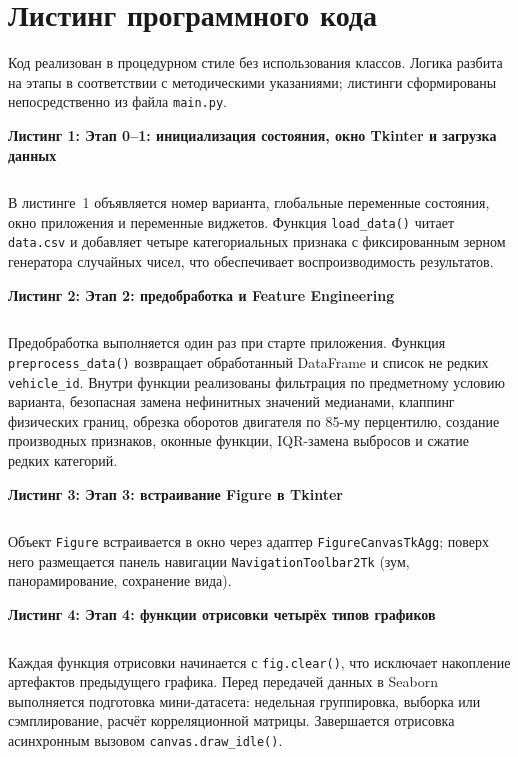 \documentclass[oneside,a4paper,14pt]{extarticle}
\begin{document}
\section{Листинг программного кода}

Код реализован в процедурном стиле без использования классов. Логика разбита на этапы в соответствии с методическими указаниями; листинги сформированы непосредственно из файла \texttt{main.py}.

\noindent\textbf{Листинг 1: Этап 0--1: инициализация состояния, окно Tkinter и загрузка данных}\par\smallskip
\inputminted[firstline=1,lastline=62]{python}{main.py}

В листинге~1 объявляется номер варианта, глобальные переменные состояния, окно приложения и переменные виджетов. Функция \texttt{load\_data()} читает \texttt{data.csv} и добавляет четыре категориальных признака с фиксированным зерном генератора случайных чисел, что обеспечивает воспроизводимость результатов.

\noindent\textbf{Листинг 2: Этап 2: предобработка и Feature Engineering}\par\smallskip
\inputminted[firstline=65,lastline=159]{python}{main.py}

Предобработка выполняется один раз при старте приложения. Функция \texttt{preprocess\_data()} возвращает обработанный DataFrame и список не редких \texttt{vehicle\_id}. Внутри функции реализованы фильтрация по предметному условию варианта, безопасная замена нефинитных значений медианами, клаппинг физических границ, обрезка оборотов двигателя по 85-му перцентилю, создание производных признаков, оконные функции, IQR-замена выбросов и сжатие редких категорий.

\noindent\textbf{Листинг 3: Этап 3: встраивание Figure в Tkinter}\par\smallskip
\inputminted[firstline=162,lastline=171]{python}{main.py}

Объект \texttt{Figure} встраивается в окно через адаптер \texttt{FigureCanvasTkAgg}; поверх него размещается панель навигации \texttt{NavigationToolbar2Tk} (зум, панорамирование, сохранение вида).

\noindent\textbf{Листинг 4: Этап 4: функции отрисовки четырёх типов графиков}\par\smallskip
\inputminted[firstline=174,lastline=263]{python}{main.py}

Каждая функция отрисовки начинается с \texttt{fig.clear()}, что исключает накопление артефактов предыдущего графика. Перед передачей данных в Seaborn выполняется подготовка мини-датасета: недельная группировка, выборка или сэмплирование, расчёт корреляционной матрицы. Завершается отрисовка асинхронным вызовом \texttt{canvas.draw\_idle()}.
\end{document}
